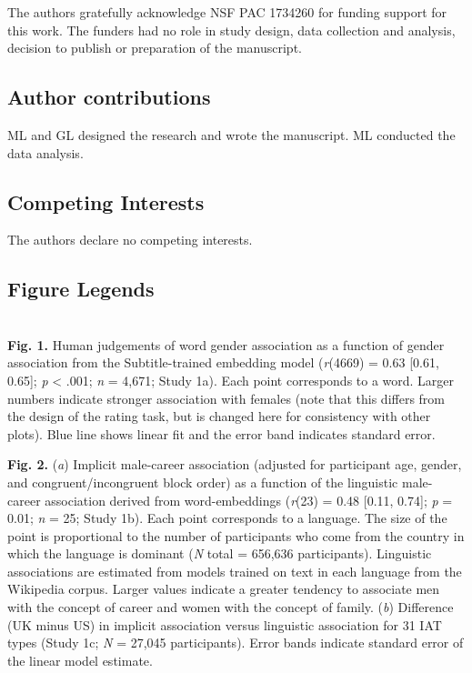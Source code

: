 \documentclass[11pt]{wlscirep}
\begin{document}
The authors gratefully acknowledge NSF PAC 1734260 for funding support for this work. The funders had no role in study design, data collection and analysis, decision to publish or preparation of the manuscript.

\subsection*{Author contributions}

ML and GL designed the research and wrote the manuscript. ML conducted the data analysis.

\subsection*{Competing Interests}
The authors declare no competing interests.

\subsection*{Figure Legends} ~\\


{\bf Fig. 1.} Human judgements of word gender association as
a function of gender association from the Subtitle-trained embedding model
(\emph{r}(4669) = 0.63 {[}0.61, 0.65{]}; \emph{p} \textless{} .001; {\emph n} = 4,671; Study 1a). Each point corresponds to a word. Larger numbers indicate
stronger association with females (note that this differs from the
design of the rating task, but is changed here for consistency with
other plots). Blue line shows linear fit and the error band indicates
standard error.


 {\bf Fig. 2.} ({\it a})  Implicit male-career association (adjusted for participant age, gender, and congruent/incongruent block order) as a function of the linguistic male-career association derived from word-embeddings (\emph{r}(23) = 0.48 {[}0.11, 0.74{]}; \emph{p} = 0.01; \emph{n} = 25; Study 1b). Each point corresponds to a language. The size of the point is proportional to the number of participants who come from the country in which the language is dominant ({\it N} total = 656,636 participants). Linguistic associations are estimated from models trained on text in each language from the Wikipedia corpus. Larger values indicate a greater tendency to associate men with the concept of career and women with the concept of family. ({\it b}) Difference (UK minus US) in implicit association versus linguistic association for 31 IAT types (Study 1c; {\it N} = 27,045 participants). Error bands indicate standard error of the linear model
estimate.
\end{document}
